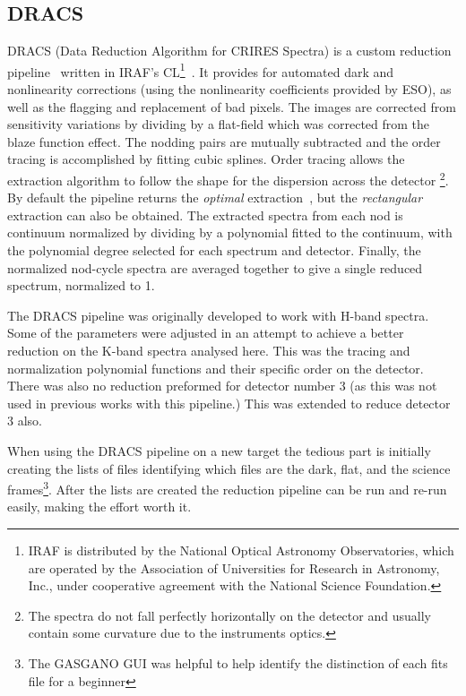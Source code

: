 \subsection{DRACS}
\label{subsec:dracs}
DRACS (Data Reduction Algorithm for CRIRES Spectra) is a custom reduction pipeline~\citep{figueira_radial_2010} written in IRAF's CL\footnote{IRAF is distributed by the National Optical Astronomy Observatories, which are operated by the Association of Universities for Research in Astronomy, {Inc.}, under cooperative agreement with the National Science Foundation.}~\citep{tody_iraf_1993}. It provides for automated dark and nonlinearity corrections (using the nonlinearity coefficients provided by ESO), as well as the flagging and replacement of bad pixels. The images are corrected from sensitivity variations by dividing by a flat-field which was corrected from the blaze function effect. The nodding pairs are mutually subtracted and the order tracing is accomplished by fitting cubic splines. Order tracing allows the extraction algorithm to follow the shape for the dispersion across the detector \footnote{The spectra do not fall perfectly horizontally on the detector and usually contain some curvature due to the instruments optics.}.
By default the pipeline returns the \emph{optimal} extraction~\citep{horne_optimal_1986}, but the \emph{rectangular} extraction can also be obtained. The extracted spectra from each nod is continuum normalized by dividing by a polynomial fitted to the continuum, with the polynomial degree selected for each spectrum and detector. Finally, the normalized nod-cycle spectra are averaged together to give a single reduced spectrum, normalized to 1.

The DRACS pipeline was originally developed to work with H-band spectra. Some of the parameters were adjusted in an attempt to achieve a better reduction on the K-band spectra analysed here. This was the tracing and normalization polynomial functions and their specific order on the detector. There was also no reduction preformed for detector number 3 (as this was not used in previous works with this pipeline.) This was extended to reduce detector 3 also.

When using the DRACS pipeline on a new target the tedious part is initially creating the lists of files identifying which files are the dark, flat, and the science frames\footnote{The GASGANO GUI was helpful to help identify the distinction of each fits file for a beginner}. After the lists are created the reduction pipeline can be run and re-run easily, making the effort worth it.

